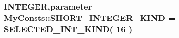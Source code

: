 \label{namespace_my_consts_a2d3348d585376d97fd760ceea81f0b65}
\hypertarget{namespace_my_consts_a12ff6515269f67ce554ac8d092a2119e}{
\subsubsection[{SHORT\_\-INTEGER\_\-KIND}]{\setlength{\rightskip}{0pt plus 5cm}INTEGER,parameter {\bf MyConsts::SHORT\_\-INTEGER\_\-KIND} = SELECTED\_\-INT\_\-KIND( 16 )}}
\label{namespace_my_consts_a12ff6515269f67ce554ac8d092a2119e}
